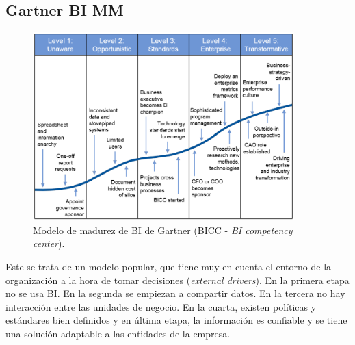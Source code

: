 \subsection{Gartner BI MM}

\begin{figure}[H]
\centering
\includegraphics[width=0.9\textwidth]{fotos/8.png}
\caption{Modelo de madurez de BI de Gartner (BICC - \textit{BI competency center}).}
\label{fig:8}
\end{figure}

Este se trata de un modelo popular, que tiene muy en cuenta el entorno de la organización a la hora de tomar decisiones (\textit{external drivers}). En la primera etapa no se usa BI. En la segunda se empiezan a compartir datos. En la tercera no hay interacción entre las unidades de negocio. En la cuarta, existen políticas y estándares bien definidos y en última etapa, la información es confiable y se tiene una solución adaptable a las entidades de la empresa. 

